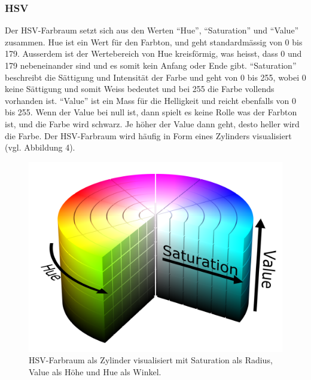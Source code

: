 \documentclass[a4paper, 12pt]{article}
\begin{document}
\subsubsection{HSV}
Der HSV-Farbraum setzt sich aus den Werten "`Hue"', "`Saturation"' und "`Value"' zusammen. Hue ist ein Wert für den Farbton, und geht standardmässig von 0 bis 179. Ausserdem ist der Wertebereich von Hue kreisförmig, was heisst, dass 0 und 179 nebeneinander sind und es somit kein Anfang oder Ende gibt. "`Saturation"' beschreibt die Sättigung und Intensität der Farbe und geht von 0 bis 255, wobei 0 keine Sättigung und somit Weiss bedeutet und bei 255 die Farbe vollends vorhanden ist. "`Value"' ist ein Mass für die Helligkeit und reicht ebenfalls von 0 bis 255. Wenn der Value bei null ist, dann spielt es keine Rolle was der Farbton ist, und die Farbe wird schwarz. Je höher der Value dann geht, desto heller wird die Farbe. \cite{RGBHSV} Der HSV-Farbraum wird häufig in Form eines Zylinders visualisiert (vgl. Abbildung 4).
\begin{figure}[H]
\includegraphics[scale=0.07]{HSV_Zylinder} 
\caption{HSV-Farbraum als Zylinder visualisiert mit Saturation als Radius, Value als Höhe und Hue als Winkel. \cite{RGBHSV}}
\end{figure}
\end{document}

